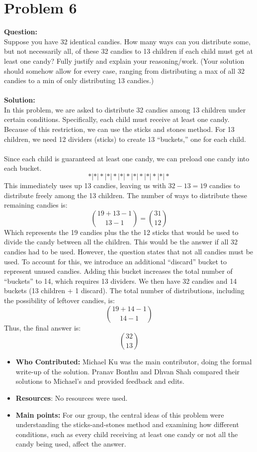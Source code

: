 \documentclass{article}
\begin{document}
\section*{Problem 6}
\textbf{Question:}\\ Suppose you have 32 identical candies. How many ways can you distribute some, but not necessarily all, of these 32 candies to 13  children if each child must get at least one candy? Fully justify and explain your reasoning/work. (Your solution should somehow allow for every case, ranging from distributing a max of all 32 candies to a min of only distributing 13 candies.)\\\\
\textbf{Solution:}\\In this problem, we are asked to distribute 32 candies among 13 children under certain conditions. Specifically, each child must receive at least one candy. Because of this restriction, we can use the sticks and stones method. For 13 children, we need 12 dividers (sticks) to create 13 “buckets,” one for each child. \\\\
Since each child is guaranteed at least one candy, we can preload one candy into each bucket. 
\[*|*|*|*|*|*|*|*|*|*|*|*|*\]
This immediately uses up 13 candies, leaving us with $32-13=19$ candies to distribute freely among the 13 children. The number of ways to distribute these remaining candies is:
\[\binom{19+13-1}{13-1} = \binom{31}{12}\]
Which represents the 19 candies plus the the 12 sticks that would be used to divide the candy between all the children. This would be the answer if all 32 candies had to be used. However, the question states that not all candies must be used. To account for this, we introduce an additional “discard” bucket to represent unused candies. Adding this bucket increases the total number of “buckets” to 14, which requires 13 dividers. We then have 32 candies and 14 buckets (13 children + 1 discard). The total number of distributions, including the possibility of leftover candies, is:\\
\[\binom{19+14-1}{14-1}\]
Thus, the final answer is:
\[\binom{32}{13}\]
\begin{itemize}

\item \textbf{Who Contributed:} Michael Ku was the main contributor, doing the formal write-up of the solution. Pranav Bonthu and Dhvan Shah compared their solutions to Michael's and provided feedback and edits.
\item \textbf{Resources}: No resources were used.
\item \textbf{Main points:}  For our group, the central ideas of this problem were understanding the sticks-and-stones method and examining how different conditions, such as every child receiving at least one candy or not all the candy being used, affect the answer.
\end{itemize}
\end{document}
